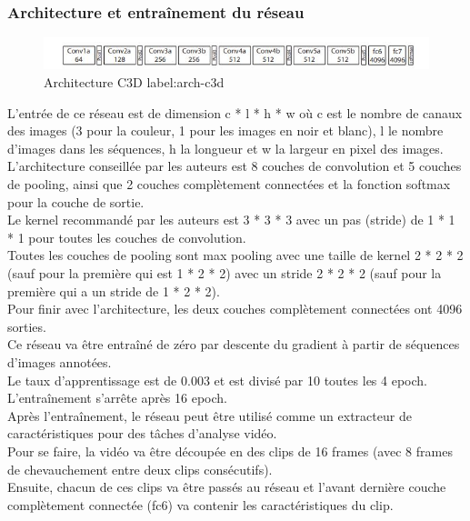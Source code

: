 \documentclass[11pt]{article}
\begin{document}
\subsubsection{Architecture et entraînement du réseau}
\label{sec:org0ab1d54}
\begin{figure}[htbp]
\centering
\includegraphics[width=13cm]{c3d_architecture.jpg}
\caption{Architecture C3D label:arch-c3d}
\end{figure}
L'entrée de ce réseau est de dimension c * l * h * w où c est le nombre de canaux des images (3 pour la couleur, 1 pour les images en noir et blanc), l le nombre d'images dans les séquences, h la longueur et w la largeur en pixel des images.\\

L'architecture conseillée par les auteurs est 8 couches de convolution et 5 couches de pooling, ainsi que 2 couches complètement connectées et la fonction softmax pour la couche de sortie.\\
Le kernel recommandé par les auteurs est 3 * 3 * 3 avec un pas (stride) de 1 * 1 * 1 pour toutes les couches de convolution.\\
Toutes les couches de pooling sont max pooling avec une taille de kernel 2 * 2 * 2 (sauf pour la première qui est 1 * 2 * 2) avec un stride 2 * 2 * 2 (sauf pour la première qui a un stride de 1 * 2 * 2).\\
Pour finir avec l'architecture, les deux couches complètement connectées ont 4096 sorties.\\

Ce réseau va être entraîné de zéro par descente du gradient à partir de séquences d'images annotées.\\
Le taux d'apprentissage est de 0.003 et est divisé par 10 toutes les 4 epoch.\\
L'entraînement s'arrête après 16 epoch.\\

Après l'entraînement, le réseau peut être utilisé comme un extracteur de caractéristiques pour des tâches d'analyse vidéo.\\
Pour se faire, la vidéo va être découpée en des clips de 16 frames (avec 8 frames de chevauchement entre deux clips consécutifs).\\
Ensuite, chacun de ces clips va être passés au réseau et l'avant dernière couche complètement connectée (fc6) va contenir les caractéristiques du clip.\\
\end{document}

